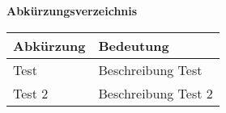 
\noindent\textbf{\Huge \textsf{Abkürzungsverzeichnis}}

\begin{table}[H]
    \begin{center}
        \begin{tabular}{|l | l|}
            \hline
            \textbf{Abkürzung} & \textbf{Bedeutung}  \\
            \hline
            Test               & Beschreibung Test   \\
            Test 2             & Beschreibung Test 2 \\
            \hline
        \end{tabular}
        \label{tab:abkuerzungsverzeichnis}
    \end{center}
\end{table}

\pagebreak
